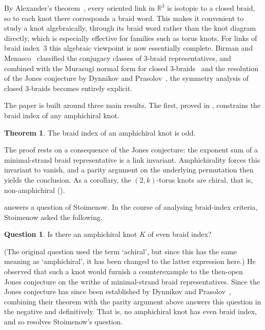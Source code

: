\documentclass[11pt]{article}
\theoremstyle{definition}
\newtheorem{maintheorem}{Theorem}
\newtheorem*{namedquestion}{Question}
\begin{document}
By Alexander's theorem~\cite[Theorem~2.3]{KasselTuraev}, every oriented link in
$\mathbb{R}^3$ is isotopic to a closed braid, so to each knot there corresponds a
braid word. This makes it convenient to study a knot algebraically, through its
braid word rather than the knot diagram directly, which is especially effective
for families such as torus knots. For links of braid index~$3$ this algebraic viewpoint is now
essentially complete. Birman and Menasco~\cite[The Classification Theorem
(Version~1)]{BM1993} classified the conjugacy classes of $3$-braid
representatives, and combined with the Murasugi normal form for closed
$3$-braids~\cite[Theorem~6.1]{DasbachLowrance2011} and the resolution of the Jones
conjecture by Dynnikov and Prasolov~\cite[Theorem~9]{DP2013}, the symmetry
analysis of closed $3$-braids becomes entirely explicit.

The paper is built around three main results. The first, proved in
, constrains the braid index of any amphichiral
knot.

\begin{maintheorem}\label{thm:A}
The braid index of an amphichiral knot is odd.
\end{maintheorem}

\noindent
The proof rests on a consequence of the Jones conjecture: the exponent sum of a
minimal-strand braid representative is a link invariant. Amphichirality forces
this invariant to vanish, and a parity argument on the underlying permutation
then yields the conclusion. As a corollary, the $(2,k)$-torus knots are chiral,
that is, non-amphichiral ().

 answers a question of Stoimenow. In the course of analysing
braid-index criteria, Stoimenow \cite[Question~4]{StoimenowMFW} asked the following.
\begin{namedquestion}
Is there an amphichiral knot $K$ of even braid index?
\end{namedquestion}
\noindent(The original question used the term `achiral', but since this has the
same meaning as `amphichiral', it has been changed to the latter expression here.)
He observed that such a knot would furnish a counterexample to the then-open Jones conjecture
on the writhe of minimal-strand braid representatives. Since the Jones conjecture
has since been established by Dynnikov and Prasolov~\cite[Theorem~9]{DP2013}, combining their
theorem with the parity argument above answers this question in the negative and
definitively. That is, no amphichiral knot has even braid index, and so 
resolves Stoimenow's question.
\end{document}
